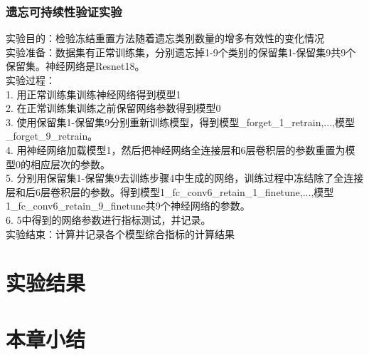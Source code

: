 \subsubsection{遗忘可持续性验证实验}
实验目的：检验冻结重置方法随着遗忘类别数量的增多有效性的变化情况
\\实验准备：数据集有正常训练集，分别遗忘掉1-9个类别的保留集1-保留集9共9个保留集。神经网络是Resnet18。
\\实验过程：
\\1. 用正常训练集训练神经网络得到模型1
\\2. 在正常训练集训练之前保留网络参数得到模型0
\\3. 使用保留集1-保留集9分别重新训练模型，得到模型\_forget\_1\_retrain,...,模型\_forget\_9\_retrain。
\\4. 用神经网络加载模型1，然后把神经网络全连接层和6层卷积层的参数重置为模型0的相应层次的参数。
\\5. 分别用保留集1-保留集9去训练步骤4中生成的网络，训练过程中冻结除了全连接层和后6层卷积层的参数。得到模型1\_fc\_conv6\_retain\_1\_finetune,...,模型1\_fc\_conv6\_retain\_9\_finetune共9个神经网络的参数。
\\6. 5中得到的网络参数进行指标测试，并记录。
\\实验结束：计算并记录各个模型综合指标的计算结果
\section{实验结果}

\section{本章小结}


